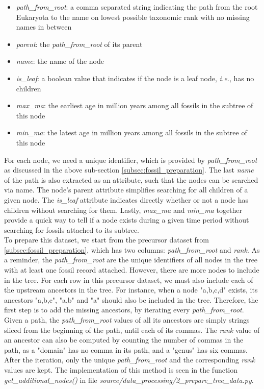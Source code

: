 \documentclass[11pt, a4paper,oneside,chapterprefix=false]{scrbook}
\begin{document}
\begin{itemize}
	\item \textit{path\_from\_root}: a comma separated string indicating the path from the root Eukaryota to the name on lowest possible taxonomic rank with no missing names in between
	\item \textit{parent}: the \textit{path\_from\_root} of its parent
	\item \textit{name}: the name of the node
	\item \textit{is\_leaf}: a boolean value that indicates if the node is a leaf node, \textit{i.e.}, has no children
	\item \textit{max\_ma}: the earliest age in million years among all fossils in the subtree of this node
	\item \textit{min\_ma}: the latest age in million years among all fossils in the subtree of this node
\end{itemize}

For each node, we need a unique identifier, which is provided by \emph{path\_from\_root} as discussed in the above sub-section \ref{subsec:fossil_preparation}. The last \emph{name} of the path is also extracted as an attribute, such that the nodes can be searched via name. The node's parent attribute simplifies searching for all children of a given node. The \emph{is\_leaf} attribute indicates directly whether or not a node has children without searching for them. Lastly, \emph{max\_ma} and \emph{min\_ma} together provide a quick way to tell if a node exists during a given time period without searching for fossils attached to its subtree. \\

To prepare this dataset, we start from the precursor dataset from \ref{subsec:fossil_preparation}, which has two columns: \emph{path\_from\_root} and \emph{rank}. As a reminder, the \emph{path\_from\_root} are the unique identifiers of all nodes in the tree with at least one fossil record attached. However, there are more nodes to include in the tree. For each row in this precursor dataset, we must also include each of the upstream ancestors in the tree. For instance, when a node "a,b,c,d" exists, its ancestors "a,b,c", "a,b" and "a" should also be included in the tree. Therefore, the first step is to add the missing ancestors, by iterating every \emph{path\_from\_root}. Given a path, the \emph{path\_from\_root} values of all its ancestors are simply strings sliced from the beginning of the path, until each of its commas. The \emph{rank} value of an ancestor can also be computed by counting the number of commas in the path, as a "domain" has no comma in its path, and a "genus" has six commas. After the iteration, only the unique \emph{path\_from\_root} and the corresponding \emph{rank} values are kept. The implementation of this method is seen in the function \emph{get\_additional\_nodes()} in file \emph{source/data\_processing/2\_prepare\_tree\_data.py}. \\
\end{document}

